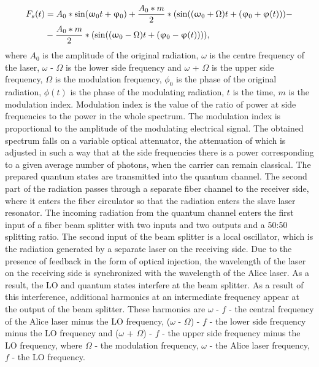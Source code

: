 \begin{align}
\label{eq:spectrum seed syn}
F_s(t) & = A_0 * \sin(\omega_0 t + \phi_0) + \frac{A_0 * m}{2} * (\sin((\omega_0 + \Omega)t + (\phi_0 + \phi (t))) - \notag \\\
&- \frac{A_0 * m}{2} * (\sin((\omega_0 - \Omega)t + (\phi_0 - \phi (t)))),
\end{align} where $A_0$ is the amplitude of the original radiation, $\omega$ is the centre frequency of the laser, $\omega$ - $\Omega$ is the lower side frequency and $\omega$ + $\Omega$ is the upper side frequency, $\Omega$ is the modulation frequency, $\phi_0$ is the phase of the original radiation, $\phi(t)$ is the phase of the modulating radiation, $t$ is the time, $m$ is the modulation index. Modulation index is the value of the ratio of power at side frequencies to the power in the whole spectrum. The modulation index is proportional to the amplitude of the modulating electrical signal.  The obtained spectrum falls on a variable optical attenuator, the attenuation of which is adjusted in such a way that at the side frequencies there is a power corresponding to a given average number of photons, when the carrier can remain classical. The prepared quantum states are transmitted into the quantum channel. 
The second part of the radiation passes through a separate fiber channel to the receiver side, where it enters the fiber circulator so that the radiation enters the slave laser resonator. 
The incoming radiation from the quantum channel enters the first input of a fiber beam splitter with two inputs and two outputs and a 50:50 splitting ratio. The second input of the beam splitter is a local oscillator, which is the radiation generated by a separate laser on the receiving side. Due to the presence of feedback in the form of optical injection, the wavelength of the laser on the receiving side is synchronized with the wavelength of the Alice laser. As a result, the LO and quantum states interfere at the beam splitter. As a result of this interference, additional harmonics at an intermediate frequency appear at the output of the beam splitter. These harmonics are $\omega$ - $f$ - the central frequency of the Alice laser minus the LO frequency, ($\omega$ - $\Omega$) - $f$ - the lower side frequency minus the LO frequency and ($\omega$ + $\Omega$) - $f$ - the upper side frequency minus the LO frequency, where $\Omega$ - the modulation frequency, $\omega$ - the Alice laser frequency, $f$ - the LO frequency. 
